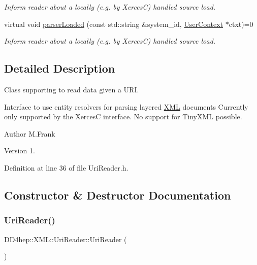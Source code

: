 \begin{DoxyCompactItemize}
\begin{DoxyCompactList}\small\item\em Inform reader about a locally (e.\+g. by XercesC) handled source load. \end{DoxyCompactList}\item 
virtual void \hyperlink{class_d_d4hep_1_1_x_m_l_1_1_uri_reader_ad04589fb5da7fe238c1a0cf1c8e4f0ac}{parser\+Loaded} (const std\+::string \&system\+\_\+id, \hyperlink{struct_d_d4hep_1_1_x_m_l_1_1_uri_reader_1_1_user_context}{User\+Context} $\ast$ctxt)=0
\begin{DoxyCompactList}\small\item\em Inform reader about a locally (e.\+g. by XercesC) handled source load. \end{DoxyCompactList}\end{DoxyCompactItemize}


\subsection{Detailed Description}
Class supporting to read data given a U\+RI. 

Interface to use entity resolvers for parsing layered \hyperlink{namespace_d_d4hep_1_1_x_m_l}{X\+ML} documents Currently only supported by the XercesC interface. No support for Tiny\+X\+ML possible.

\begin{DoxyAuthor}{Author}
M.\+Frank 
\end{DoxyAuthor}
\begin{DoxyVersion}{Version}
1. 
\end{DoxyVersion}


Definition at line 36 of file Uri\+Reader.\+h.



\subsection{Constructor \& Destructor Documentation}
\hypertarget{class_d_d4hep_1_1_x_m_l_1_1_uri_reader_a9e7b119a191640572c3cdf2b8c3e3023}{}\label{class_d_d4hep_1_1_x_m_l_1_1_uri_reader_a9e7b119a191640572c3cdf2b8c3e3023} 
\subsubsection{\texorpdfstring{Uri\+Reader()}{UriReader()}}
{\footnotesize\ttfamily D\+D4hep\+::\+X\+M\+L\+::\+Uri\+Reader\+::\+Uri\+Reader (\begin{DoxyParamCaption}{ }\end{DoxyParamCaption})\hspace{0.3cm}{\ttfamily [inline]}}



